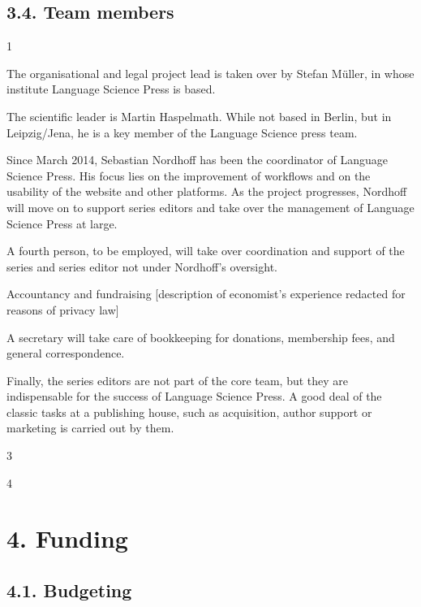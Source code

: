 \documentclass[output=guidelines,draftmode]{langscibook}
\newcommand{\background}[1]{ 
  \vspace{5mm}
  \renewcommand{\tblslinecolour}{lsDarkBlue}
  \tblssy[red]{explore2}{Background}{#1}
}
\newcommand{\langscisolution}[1]{
  \renewcommand{\tblslinecolour}{lsLightBlue}
  \tblssy{langsci}{LangSci solution}{#1}
}
\newcommand{\evaluation}[1]{
  \renewcommand{\tblslinecolour}{lsLightOrange}
  \tblssy{receipt}{Evaluation}{#1}
}
\newcommand{\othersolutions}[1]{
  \renewcommand{\tblslinecolour}{lsDarkGreenOne}
  \tblssy{more}{Other solutions}{#1}
}
\renewcommand{\tblssy}[4][black!12]{%
  \renewcommand{\langscisymbol}{#2}\renewcommand{\tblsboxcolor}{#1}
  \begin{mdframed}[style=yellowexercise,frametitle={#3}]
    #4
  \end{mdframed}
}
\begin{document}
\section{3.4. Team members}

\background{1}
\langscisolution{
The organisational and legal project lead is taken over by Stefan Müller, in whose institute Language Science Press is based.

The scientific leader is Martin Haspelmath. While not based in Berlin, but in Leipzig/Jena, he is a key member of the Language Science press team.

Since March 2014, Sebastian Nordhoff has been the coordinator of Language Science Press. His focus lies on the improvement of workflows and on the usability of the website and other platforms. As the project progresses, Nordhoff will move on to support series editors and take over the management of Language Science Press at large.

A fourth person, to be employed, will take over coordination and support of the series and series editor not under Nordhoff's oversight. 

Accountancy and fundraising
[description of economist's experience redacted for reasons of  privacy law]

A secretary will take care of bookkeeping for donations, membership fees, and general correspondence.

Finally, the series editors are not part of the core team, but they are indispensable for the success of Language Science Press. A good deal of the classic tasks at a publishing house, such as acquisition, author support or marketing is carried out by them. 

}
\evaluation{3}
\othersolutions{4}
 

\chapter{4. Funding}

\section{4.1. Budgeting}
\end{document}
